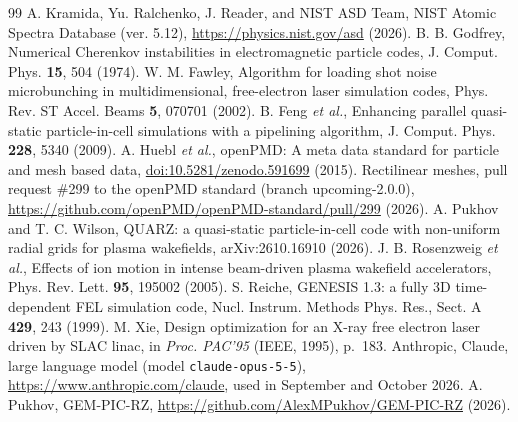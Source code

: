 \documentclass[aps,prab,reprint,floatfix,superscriptaddress,amsmath,amssymb]{revtex4-2}
\begin{document}
\begin{thebibliography}{99}
 A. Kramida, Yu. Ralchenko, J. Reader, and NIST ASD Team, NIST Atomic Spectra Database (ver. 5.12), \url{https://physics.nist.gov/asd} (2026).
 B. B. Godfrey, Numerical Cherenkov instabilities in electromagnetic particle codes, J. Comput. Phys. \textbf{15}, 504 (1974).
 W. M. Fawley, Algorithm for loading shot noise microbunching in multidimensional, free-electron laser simulation codes, Phys. Rev. ST Accel. Beams \textbf{5}, 070701 (2002).
 B. Feng \textit{et al.}, Enhancing parallel quasi-static particle-in-cell simulations with a pipelining algorithm, J. Comput. Phys. \textbf{228}, 5340 (2009).
 A. Huebl \textit{et al.}, openPMD: A meta data standard for particle and mesh based data, \href{https://doi.org/10.5281/zenodo.591699}{doi:10.5281/zenodo.591699} (2015).
 Rectilinear meshes, pull request \#299 to the openPMD standard (branch upcoming-2.0.0), \url{https://github.com/openPMD/openPMD-standard/pull/299} (2026).
 A. Pukhov and T. C. Wilson, QUARZ: a quasi-static particle-in-cell code with non-uniform radial grids for plasma wakefields, arXiv:2610.16910 (2026).
 J. B. Rosenzweig \textit{et al.}, Effects of ion motion in intense beam-driven plasma wakefield accelerators, Phys. Rev. Lett. \textbf{95}, 195002 (2005).
 S. Reiche, GENESIS 1.3: a fully 3D time-dependent FEL simulation code, Nucl. Instrum. Methods Phys. Res., Sect. A \textbf{429}, 243 (1999).
 M. Xie, Design optimization for an X-ray free electron laser driven by SLAC linac, in \textit{Proc. PAC'95} (IEEE, 1995), p.~183.
 Anthropic, Claude, large language model (model \texttt{claude-opus-5-5}), \url{https://www.anthropic.com/claude}, used in September and October 2026.
 A. Pukhov, GEM-PIC-RZ, \url{https://github.com/AlexMPukhov/GEM-PIC-RZ} (2026).
\end{thebibliography}
\end{document}
